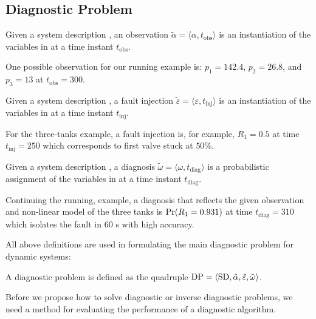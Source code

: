\subsection{Diagnostic Problem}
%
\begin{definition}[Observation]
%
Given a system description \sd, an observation $\tilde\alpha =
\langle\alpha, t_{\mathrm{obs}}\rangle$ is an instantiation of the
variables in \obs at a time instant $t_{\mathrm{obs}}$.
%
\end{definition}
%
One possible observation for our running example is:
$p_1 = 142.4$, $p_2 = 26.8$, and $p_3 = 13$ at $t_{\mathrm{obs}} =
300$.
%
\begin{definition}
%
Given a system description \sd, a fault injection $\tilde{\varepsilon}
= \langle\varepsilon, t_{\mathrm{inj}}\rangle$ is an instantiation of
the variables in \comps at a time instant $t_{\mathrm{inj}}$.
%
\end{definition}
%
For the three-tanks example, a fault injection is, for example, $R_1 =
0.5$ at time $t_{\mathrm{inj}} = 250$ which corresponds to first valve
stuck at $50\%$.
%
\begin{definition}[Diagnosis]
%
Given a system description \sd, a diagnosis $\tilde{\omega} =
\langle\omega, t_{\mathrm{diag}}\rangle$ is a probabilistic assignment
of the variables in \comps at a time instant $t_{\mathrm{diag}}$.
%
\end{definition}
%
Continuing the running, example, a diagnosis that reflects the given
observation and non-linear model of the three tanks is $\mathrm{Pr}(R_1 =
0.931)$ at time $t_{\mathrm{diag}} = 310$ which isolates the fault in
$60$ s with high accuracy.
\par
All above definitions are used in formulating the main diagnostic
problem for dynamic systems:
%
\begin{definition}
%
A diagnostic problem \dproblem is defined as the quadruple $\mathrm{DP}
= \langle\mathrm{SD}, \tilde{\alpha}, \tilde{\varepsilon},
\tilde{\omega}\rangle$.
%
\end{definition}
%
Before we propose how to solve diagnostic or inverse diagnostic
problems, we need a method for evaluating the performance of a
diagnostic algorithm.
%
